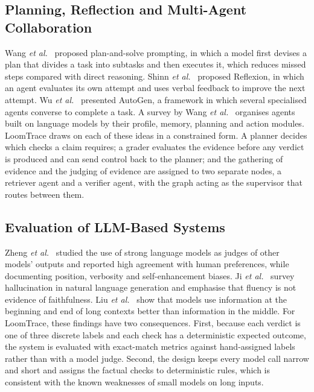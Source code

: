 \subsection{Planning, Reflection and Multi-Agent Collaboration}

Wang \emph{et al.}~\cite{wang2023plansolve} proposed plan-and-solve prompting, in which a model first
devises a plan that divides a task into subtasks and then executes it, which reduces missed steps
compared with direct reasoning. Shinn \emph{et al.}~\cite{shinn2023reflexion} proposed Reflexion, in
which an agent evaluates its own attempt and uses verbal feedback to improve the next attempt. Wu
\emph{et al.}~\cite{wu2023autogen} presented AutoGen, a framework in which several specialised agents
converse to complete a task. A survey by Wang \emph{et al.}~\cite{wang2024survey} organises agents built
on language models by their profile, memory, planning and action modules. LoomTrace draws on each of
these ideas in a constrained form. A planner decides which checks a claim requires; a grader evaluates
the evidence before any verdict is produced and can send control back to the planner; and the
gathering of evidence and the judging of evidence are assigned to two separate nodes, a retriever agent
and a verifier agent, with the graph acting as the supervisor that routes between them.

\subsection{Evaluation of LLM-Based Systems}

Zheng \emph{et al.}~\cite{zheng2023judge} studied the use of strong language models as judges of other
models' outputs and reported high agreement with human preferences, while documenting position,
verbosity and self-enhancement biases. Ji \emph{et al.}~\cite{ji2023hallucination} survey hallucination
in natural language generation and emphasise that fluency is not evidence of faithfulness. Liu
\emph{et al.}~\cite{liu2024lost} show that models use information at the beginning and end of long
contexts better than information in the middle. For LoomTrace, these findings have two consequences.
First, because each verdict is one of three discrete labels and each check has a deterministic expected
outcome, the system is evaluated with exact-match metrics against hand-assigned labels rather than with
a model judge. Second, the design keeps every model call narrow and short and assigns the factual checks
to deterministic rules, which is consistent with the known weaknesses of small models on long inputs.

